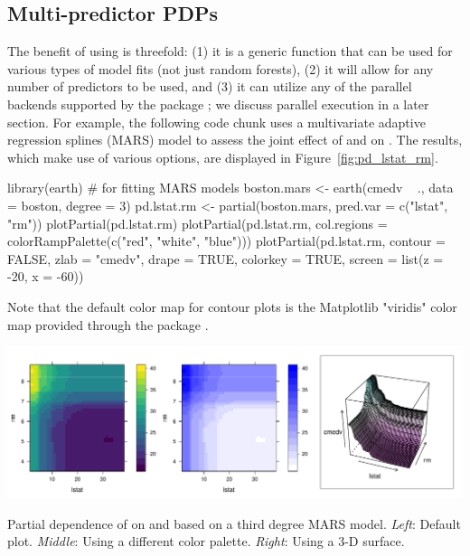 \subsection{Multi-predictor PDPs}

The benefit of using  is threefold: (1) it is a generic function that can be used for various types of model fits (not just random forests), (2) it will allow for any number of predictors to be used, and (3) it can utilize any of the parallel backends supported by the  package \citep{foreach-pkg}; we discuss parallel execution in a later section. For example, the following code chunk uses a multivariate adaptive regression splines (MARS) model \citep{friedman-1991-mars} to assess the joint effect of  and  on . The results, which make use of various  options, are displayed in Figure~\ref{fig:pd_lstat_rm}.
\begin{example}
library(earth)  # for fitting MARS models
boston.mars <- earth(cmedv ~ ., data = boston, degree = 3)
pd.lstat.rm <- partial(boston.mars, pred.var = c("lstat", "rm"))
plotPartial(pd.lstat.rm)
plotPartial(pd.lstat.rm, col.regions = colorRampPalette(c("red", "white", "blue")))
plotPartial(pd.lstat.rm, contour = FALSE, zlab = "cmedv", drape = TRUE,
            colorkey = TRUE, screen = list(z = -20, x = -60))
\end{example}
Note that the default color map for contour plots is the Matplotlib "viridis" color map provided through the  package \citep{viridis-pkg}.

\begin{widefigure}[htbp]
  \centering
  \includegraphics[width=1.0\linewidth]{pd_lstat_rm}
  \caption{Partial dependence of  on  and  based on a third degree MARS model. \textit{Left}: Default plot. \textit{Middle}: Using a different color palette. \textit{Right}: Using a 3-D surface.}
  \label{fig:pd_lstat_rm}
\end{widefigure}

